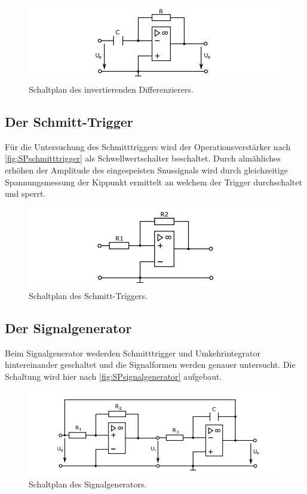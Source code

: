  \begin{figure}
    \centering
    \includegraphics[width=1\textwidth]{content/grafiken/SPumkehrdifferenzierer.PNG}
    \caption{Schaltplan des invertierenden Differenzierers.}
    \label{fig:SPumkehrdifferenzierer}
  \end{figure}



\subsection{Der Schmitt-Trigger}
Für die Untersuchung des Schmitttriggers wird der Operationsverstärker nach \autoref{fig:SPschmitttrigger}
als Schwellwertschalter beschaltet. Durch almähliches erhöhen der Amplitude des eingespeisten Snussignals 
wird durch gleichzeitige Spannungsmessung der Kippunkt ermittelt an welchem der Trigger durchschaltet und 
sperrt.
\begin{figure}
    \centering
    \includegraphics[width=1\textwidth]{content/grafiken/SPschmitttrigger.PNG}
    \caption{Schaltplan des Schmitt-Triggers.}
    \label{fig:SPschmitttrigger}
  \end{figure}




\subsection{Der Signalgenerator}
Beim Signalgenerator wederden Schmitttrigger und Umkehrintegrator hintereinander geschaltet und 
die Signalformen werden genauer untersucht. Die Schaltung wird hier nach \autoref{fig:SPsignalgenerator}
aufgebaut.

\begin{figure}
    \centering
    \includegraphics[width=1\textwidth]{content/grafiken/SPsignalgenerator.PNG}
    \caption{Schaltplan des Signalgenerators.}
    \label{fig:SPsignalgenerator}
  \end{figure}